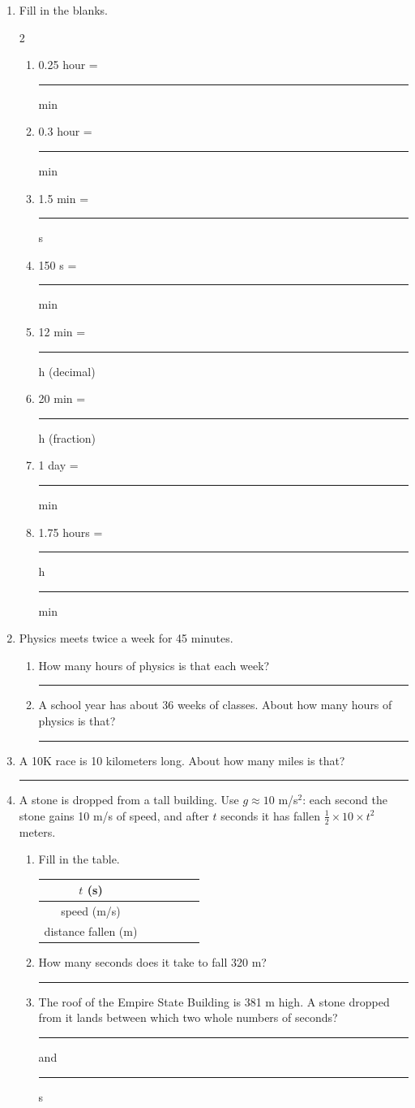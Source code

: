 \documentclass[12pt, twoside]{article}
\newcommand{\blank}[1][2.4cm]{\rule{#1}{0.4pt}}
\begin{document}
\begin{enumerate}[itemsep=0.4cm]
\item Fill in the blanks.
  \begin{multicols}{2}
    \begin{enumerate}[itemsep=0.6cm]
      \item 0.25 hour = \blank[1.8cm] min
      \item 0.3 hour = \blank[1.8cm] min
      \item 1.5 min = \blank[1.8cm] s
      \item 150 s = \blank[1.8cm] min
      \item 12 min = \blank[1.8cm] h (decimal)
      \item 20 min = \blank[1.8cm] h (fraction)
      \item 1 day = \blank[1.8cm] min
      \item 1.75 hours = \blank[1.2cm] h \blank[1.2cm] min
    \end{enumerate}
  \end{multicols}

\item Physics meets twice a week for 45 minutes.
  \begin{enumerate}[itemsep=0.6cm]
    \item How many hours of physics is that each week? \hfill \blank
    \item A school year has about 36 weeks of classes. About how many hours of
      physics is that? \hfill \blank
  \end{enumerate}

\item A 10K race is 10 kilometers long. About how many miles is that? \hfill \blank

\item A stone is dropped from a tall building. Use $g \approx 10$ m/s$^2$: each second
  the stone gains 10 m/s of speed, and after $t$ seconds it has fallen
  $\frac{1}{2} \times 10 \times t^2$ meters.
  \begin{enumerate}[itemsep=0.6cm]
    \item Fill in the table.

      \vspace{0.1cm}
      \renewcommand{\arraystretch}{1.5}
      \begin{tabular}{| c | p{1.2cm} | p{1.2cm} | p{1.2cm} | p{1.2cm} | p{1.2cm} |}
        \hline
        $t$ (s) & \centering 1 & \centering 2 & \centering 3 &
          \centering 4 & \centering\arraybackslash 5 \\ \hline
        speed (m/s) & & & & & \\ \hline
        distance fallen (m) & & & & & \\ \hline
      \end{tabular}
    \item How many seconds does it take to fall 320 m? \hfill \blank
    \item The roof of the Empire State Building is 381 m high. A stone dropped from
      it lands between which two whole numbers of seconds? \hfill
      \blank[1.2cm] and \blank[1.2cm] s
  \end{enumerate}

\end{enumerate}
\end{document}
